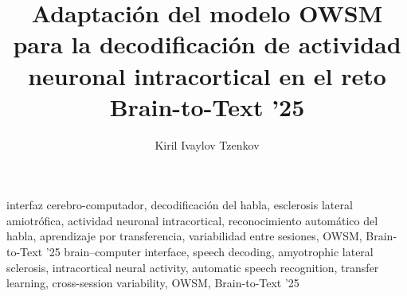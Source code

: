 %

\title{Adaptación del modelo OWSM para la decodificación de actividad neuronal intracortical en el reto Brain-to-Text '25}
\author{Kiril Ivaylov Tzenkov}

         {interfaz cerebro-computador, decodificación del habla, esclerosis lateral amiotrófica, actividad neuronal intracortical, reconocimiento automático del habla, aprendizaje por transferencia, variabilidad entre sesiones, OWSM, Brain-to-Text '25}
         {brain--computer interface, speech decoding, amyotrophic lateral sclerosis, intracortical neural activity, automatic speech recognition, transfer learning, cross-session variability, OWSM, Brain-to-Text '25}
